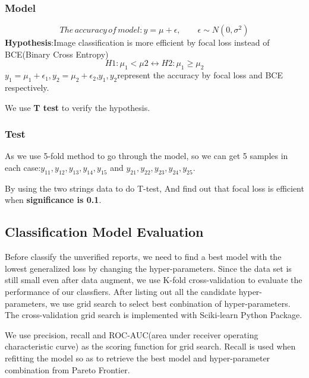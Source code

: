 \documentclass[12pt]{article}
\begin{document}
\subsubsection{Model}
\begin{equation*}
The\,accuracy\,of\,model:y=\mu+\epsilon,\qquad \epsilon\sim N(0,\sigma^2)
\end{equation*}
\textbf{Hypothesis}:Image classification is more efficient by focal loss instead of BCE(Binary Cross Entropy)
\begin{equation*}
H1:\mu_1<\mu2\leftrightarrow H2:\mu_1\geq \mu_2
\end{equation*}
$y_1=\mu_1+\epsilon_1,y_2=\mu_2+\epsilon_2$,$y_1,y_2$represent the accuracy by focal loss and BCE respectively.

We use \textbf{T test} to verify the hypothesis.
\subsubsection{Test}
As we use 5-fold method to go through the model, so we can get 5 samples in each case:$y_{11},y_{12},y_{13},y_{14},y_{15}$ and $y_{21},y_{22},y_{23},y_{24},y_{25}$.

By using the two strings data to do T-test, And find out that focal loss is efficient when \textbf{significance is 0.1}.


\subsection{	Classification Model Evaluation}

Before classify the unverified reports, we need to find a best model with the lowest generalized loss by changing the hyper-parameters. Since the data set is still small even after data augment, we use K-fold cross-validation to evaluate the performance of our classfiers. After listing out all the candidate hyper-parameters, we use grid search to select best conbination of hyper-parameters. The cross-validation grid search is implemented with Sciki-learn Python Package\cite{gscv}.

We use precision, recall and ROC-AUC(area under receiver operating characteristic curve) as the scoring function for grid search. Recall is used when refitting the model so as to retrieve the best model and hyper-parameter combination from Pareto Frontier.
\end{document}
